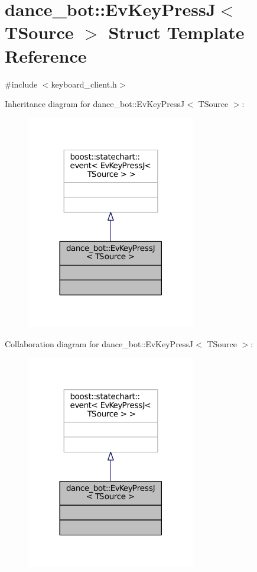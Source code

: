 \hypertarget{structdance__bot_1_1EvKeyPressJ}{}\section{dance\+\_\+bot\+:\+:Ev\+Key\+PressJ$<$ T\+Source $>$ Struct Template Reference}
\label{structdance__bot_1_1EvKeyPressJ}


{\ttfamily \#include $<$keyboard\+\_\+client.\+h$>$}



Inheritance diagram for dance\+\_\+bot\+:\+:Ev\+Key\+PressJ$<$ T\+Source $>$\+:
\nopagebreak
\begin{figure}[H]
\begin{center}
\leavevmode
\includegraphics[width=209pt]{structdance__bot_1_1EvKeyPressJ__inherit__graph}
\end{center}
\end{figure}


Collaboration diagram for dance\+\_\+bot\+:\+:Ev\+Key\+PressJ$<$ T\+Source $>$\+:
\nopagebreak
\begin{figure}[H]
\begin{center}
\leavevmode
\includegraphics[width=209pt]{structdance__bot_1_1EvKeyPressJ__coll__graph}
\end{center}
\end{figure}


